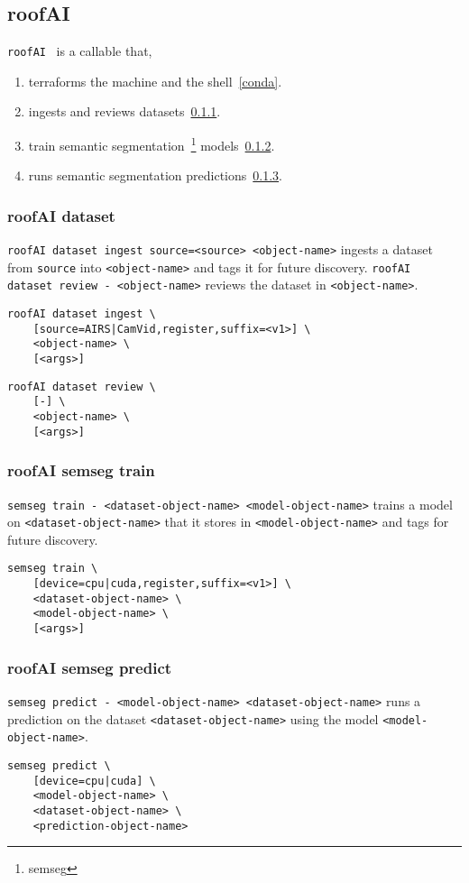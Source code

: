 \subsection{roofAI}
\label{roofAI}

\texttt{roofAI}~ is a callable that,
%
\begin{enumerate}
    \item{terraforms the machine and the shell~\ref{conda}.}
    \item{ingests and reviews datasets~\ref{roofAI_dataset}.}
    \item{train semantic segmentation~\footnote{semseg} models~\ref{roofAI_semseg_train}.}
    \item{runs semantic segmentation predictions~\ref{roofAI_semseg_predict}.}
\end{enumerate}

\subsubsection{roofAI dataset}
\label{roofAI_dataset}

\texttt{roofAI dataset ingest source=<source> <object-name>} ingests a dataset from \texttt{source} into \texttt{<object-name>} and tags it for future discovery. \texttt{roofAI dataset review - <object-name>} reviews the dataset in \texttt{<object-name>}.
%
\begin{verbatim}
roofAI dataset ingest \
    [source=AIRS|CamVid,register,suffix=<v1>] \
    <object-name> \
    [<args>]
\end{verbatim}
%
\begin{verbatim}
roofAI dataset review \
    [-] \
    <object-name> \
    [<args>]
\end{verbatim}

\subsubsection{roofAI semseg train}
\label{roofAI_semseg_train}

\texttt{semseg train - <dataset-object-name> <model-object-name>} trains a model on \texttt{<dataset-object-name>} that it stores in \texttt{<model-object-name>} and tags for future discovery.
%
\begin{verbatim}
semseg train \
    [device=cpu|cuda,register,suffix=<v1>] \
    <dataset-object-name> \
    <model-object-name> \
    [<args>]
\end{verbatim}

\subsubsection{roofAI semseg predict}
\label{roofAI_semseg_predict}

\texttt{semseg predict - <model-object-name> <dataset-object-name>} runs a prediction on the dataset \texttt{<dataset-object-name>} using the model \texttt{<model-object-name>}.
%
\begin{verbatim}
semseg predict \
    [device=cpu|cuda] \
    <model-object-name> \
    <dataset-object-name> \
    <prediction-object-name>
\end{verbatim}
